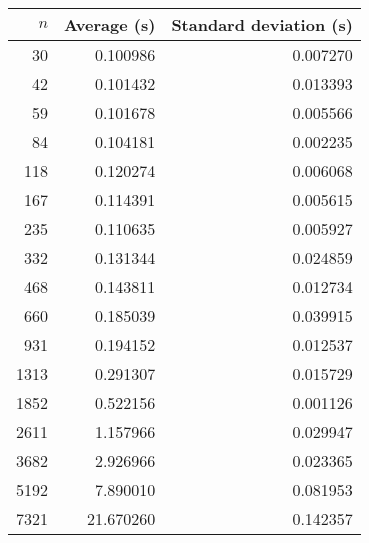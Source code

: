 \begin{tabular}{rrr}
$n$ & Average (s) & Standard deviation (s)\\\hline
30 & 0.100986 & 0.007270\\
42 & 0.101432 & 0.013393\\
59 & 0.101678 & 0.005566\\
84 & 0.104181 & 0.002235\\
118 & 0.120274 & 0.006068\\
167 & 0.114391 & 0.005615\\
235 & 0.110635 & 0.005927\\
332 & 0.131344 & 0.024859\\
468 & 0.143811 & 0.012734\\
660 & 0.185039 & 0.039915\\
931 & 0.194152 & 0.012537\\
1313 & 0.291307 & 0.015729\\
1852 & 0.522156 & 0.001126\\
2611 & 1.157966 & 0.029947\\
3682 & 2.926966 & 0.023365\\
5192 & 7.890010 & 0.081953\\
7321 & 21.670260 & 0.142357\\
\end{tabular}
